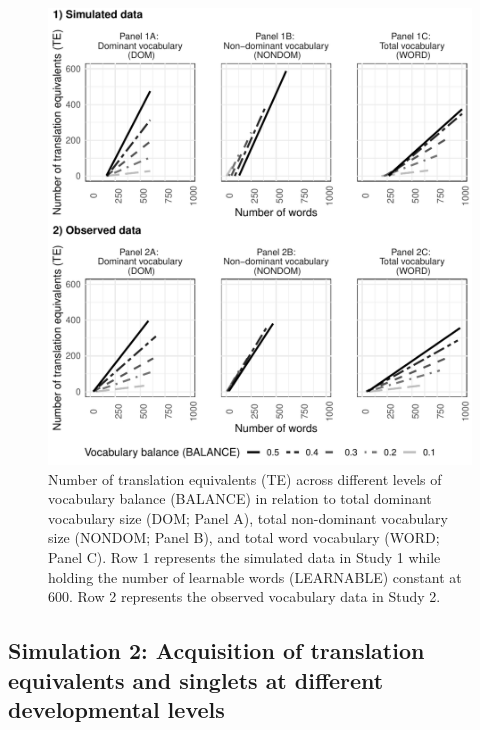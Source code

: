 \documentclass[
  english,
  ,man,floatsintext]{apa6}
\begin{document}
\begin{figure}

{\centering \includegraphics[width=1.1\linewidth,height=0.8\textheight]{paper_TE_bilingual_vocabulary_model_files/figure-latex/fig2-1} 

}

\caption{Number of translation equivalents (TE) across different levels of vocabulary balance (BALANCE) in relation to total dominant vocabulary size (DOM; Panel A), total non-dominant vocabulary size (NONDOM; Panel B), and total word vocabulary (WORD; Panel C). Row 1 represents the simulated data in Study 1 while holding the number of learnable words (LEARNABLE) constant at 600. Row 2 represents the observed vocabulary data in Study 2.}\label{fig:fig2}
\end{figure}

\hypertarget{simulation-2-acquisition-of-translation-equivalents-and-singlets-at-different-developmental-levels}{%
\subsection{Simulation 2: Acquisition of translation equivalents and singlets at different developmental levels}\label{simulation-2-acquisition-of-translation-equivalents-and-singlets-at-different-developmental-levels}}
\end{document}
